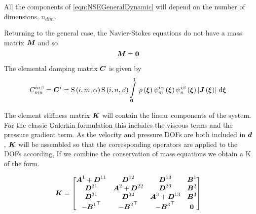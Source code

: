 All the components of \ref{eqn:NSEGeneralDynamic} will depend on the
number of dimensions, $n_{dim}$.

Returning to the general case, the Navier-Stokes equations do not have a mass
matrix $\matr{M}$ and so
\begin{equation}
  \matr{M}=\matr{0}
\end{equation}

The elemental damping matrix $\matr{C}$ is given by
\begin{equation}
  C^{i\alpha\beta}_{mn}=\matr{C}^{i}=\idxgsf{i}{m}{\alpha}\idxgsf{i}{n}{\beta}
  \gint{\vectr{0}}{\vectr{1}}{\fnof{\rho}{\vectr{\xi}}
    \idxgbfn{i}{m}{\alpha}{\vectr{\xi}}\idxgbfn{i}{n}{\beta}{\vectr{\xi}}
    \abs{\fnof{\matr{J}}{\vectr{\xi}}}}{\vectr{\xi}}
\end{equation}

The element stiffness matrix $\matr{K}$ will contain the linear components of
the system. For the classic Galerkin formulation this includes the viscous
terms and the pressure gradient term. As the velocity and pressure DOFs are
both included in $ \boldsymbol{d} $, $\matr{K}$ will be assembled so that the
corresponding operators are applied to the DOFs according. If we combine the
conservation of mass equations we obtain a K of the form.

\begin{equation}
  \matr{K}=
   \begin{bmatrix}
     \matr{A}^{1}+\matr{D}^{11} & \matr{D}^{12} & \matr{D}^{13} & \matr{B}^{1}\\
     \matr{D}^{21} & \matr{A}^{2}+\matr{D}^{22} & \matr{D}^{23} & \matr{B}^{2}\\
     \matr{D}^{31} & \matr{D}^{32} & \matr{A}^{3}+\matr{D}^{13} & \matr{B}^{3}\\
     -\transpose{\matr{B}^{1}} & -\transpose{\matr{B}^{2}} & -\transpose{\matr{B}^{3}} & \matr{0}
   \end{bmatrix}
\end{equation}


